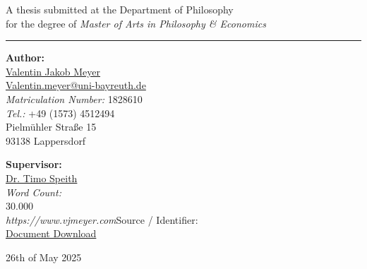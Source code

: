 \documentclass[
  11pt,
  letterpaper,
  openany]{book}
\let\cleardoublepage\clearpage
\renewcommand*\contentsname{Table of contents}
\newcommand\contentsname{Table of contents}
\begin{document}
\begin{titlepage}
\begin{center}
  A thesis submitted at the Department of Philosophy\\[0.4cm]
  for the degree of \textit{Master of Arts in Philosophy \& Economics}
\end{center}

\vspace{1.5cm}
\hrule
\vspace{1.5cm}

\begin{minipage}[t]{0.48\textwidth}
  \textbf{Author:}\\[0.3cm]
  \href{https://www.vjmeyer.com}{Valentin Jakob Meyer}\\
  \href{mailto:Valentin.meyer@uni-bayreuth.de}{Valentin.meyer@uni-bayreuth.de}\\
  \textit{Matriculation Number:} 1828610\\
  \textit{Tel.:} +49 (1573) 4512494\\
  Pielmühler Straße 15\\
  93138 Lappersdorf
\end{minipage}
\hfill
\begin{minipage}[t]{0.48\textwidth}
  \begin{flushright}
    \textbf{Supervisor:}\\[0.3cm]
    \href{mailto:timo.speith@uni-bayreuth.de}{Dr. Timo Speith}\\[0.35cm]
    \textit{Word Count:}\\
    30.000\\[0.1cm]
    \textit{https://www.vjmeyer.com}{Source / Identifier:}\\
    \href{https://github.com/VJMeyer/submission}{Document Download}
  \end{flushright}
\end{minipage}

\vfill
\begin{center}
  26th of May 2025
\end{center}
\end{titlepage}


\renewcommand*\contentsname{Table of Contents}
{
\setcounter{tocdepth}{9}
\tableofcontents
}
\listoffigures
\listoftables

\mainmatter
{}
\end{document}
